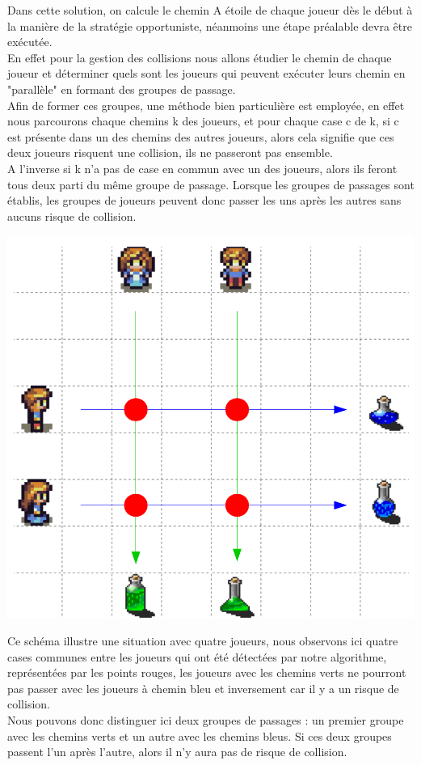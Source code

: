 \documentclass{article}
\begin{document}
	Dans cette solution, on calcule le chemin A étoile de chaque joueur dès le début à la manière de la stratégie opportuniste, néanmoins une étape préalable devra être exécutée.\\
	En effet pour la gestion des collisions nous allons étudier le chemin de chaque joueur et déterminer quels sont les joueurs qui peuvent exécuter leurs chemin en "parallèle" en formant des groupes de passage.\\
	Afin de former ces groupes, une méthode bien particulière est employée, en effet nous parcourons chaque chemins k des joueurs, et pour chaque case c de k, si c est présente dans un des chemins des autres joueurs, alors cela signifie que ces deux joueurs risquent une collision, ils ne passeront pas ensemble.\\
	A l'inverse si k n'a pas de case en commun avec un des joueurs, alors ils feront tous deux parti du même groupe de passage.
	Lorsque les groupes de passages sont établis, les groupes de joueurs peuvent donc passer les uns après les autres sans aucuns risque de collision.
\begin{center}
	\includegraphics[scale=0.25]{Solution2_ex}
\end{center}
	
	Ce schéma illustre une situation avec quatre joueurs, nous observons ici quatre cases communes entre les joueurs qui ont été détectées par notre algorithme, représentées par les points rouges, les joueurs avec les chemins verts ne pourront pas passer avec les joueurs à chemin bleu et inversement car il y a un risque de collision.\\
	Nous pouvons donc distinguer ici deux groupes de passages : un premier groupe avec les chemins verts et un autre avec les chemins bleus.
	Si ces deux groupes passent l'un après l'autre, alors il n'y aura pas de risque de collision.\\
	
\end{document}
